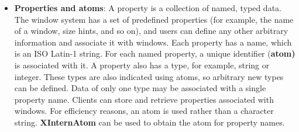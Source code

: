 \documentclass{report}
\begin{document}
\begin{itemize}
        \bigbreak \noindent 
        Think of a window as having a small key-value database attached to it:
        \bigbreak \noindent 
        \begin{verbatim}
           Window
             |--- property: WM_NAME        -> "My Terminal"
             |--- property: WM_CLASS       -> "kitty"
             |--- property: WM_HINTS       -> window-manager hints
             |--- property: _NET_WM_STATE  -> fullscreen/maximized/etc. 
        \end{verbatim}
        \bigbreak \noindent 
        Each property has three main parts:
        \begin{itemize}
            \item \textbf{name}:   what the property is called
            \item \textbf{type}:   what kind of data it stores
            \item \textbf{data}:   the actual bytes stored
        \end{itemize}
        For example, 
        \bigbreak \noindent 
        \begin{cppcode}
            name: WM_NAME
            type: STRING
            data: "My Window"
        \end{cppcode}
        \bigbreak \noindent 
        An \textbf{atom} is just a unique numeric ID for a string name.
        \bigbreak \noindent 
        \begin{cppcode}
            "WM_NAME"  -> atom 39
            "STRING"   -> atom 31
            "CARDINAL" -> atom 6
        \end{cppcode}
        \bigbreak \noindent 
        So instead of repeatedly passing the string "WM\_NAME", Xlib passes the atom representing "WM\_NAME".
    \item \textbf{Properties and atoms}: A property is a collection of named, typed data. The window system has a set of predefined properties (for example, the name of a window, size hints, and so on), and users can define any other arbitrary information and associate it with windows. Each property has a name, which is an ISO Latin-1 string. For each named property, a unique identifier (\textbf{atom)} is associated with it. A property also has a type, for example, string or integer. These types are also indicated using atoms, so arbitrary new types can be defined. Data of only one type may be associated with a single property name. Clients can store and retrieve properties associated with windows. For efficiency reasons, an atom is used rather than a character string. \textbf{XInternAtom} can be used to obtain the atom for property names.

\end{itemize}
\end{document}
